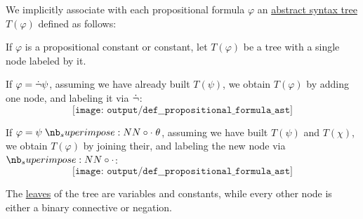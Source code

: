 \begin{definition}\label{def:propositional_fomula_ast}
  We implicitly associate with each propositional formula \( \varphi \) an \hyperref[con:abstract_syntax_tree]{abstract syntax tree} \( T(\varphi) \) defined as follows:
  \begin{thmenum}
     If \( \varphi \) is a propositional constant or constant, let \( T(\varphi) \) be a tree with a single node labeled by it.

     If \( \varphi = \dot\neg \psi \), assuming we have already built \( T(\psi) \), we obtain \( T(\varphi) \) by adding one node, and labeling it via \( \dot\neg \):
    \begin{equation*}
      \texttt{[image: output/def\_\_propositional\_formula\_ast]}
    \end{equation*}

     If \( \varphi = \psi \syncirc \theta \), assuming we have built \( T(\psi) \) and \( T(\chi) \), we obtain \( T(\varphi) \) by joining their, and labeling the new node via \( \syncirc \):
    \begin{equation*}
      \texttt{[image: output/def\_\_propositional\_formula\_ast]}
    \end{equation*}
  \end{thmenum}
\end{definition}
\begin{comments}
  \item The \hyperref[def:rooted_tree/leaf]{leaves} of the tree are variables and constants, while every other node is either a binary connective or negation.
\end{comments}

